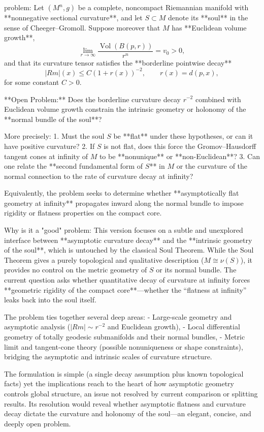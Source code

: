 problem:  
Let \((M^n, g)\) be a complete, noncompact Riemannian manifold with **nonnegative sectional curvature**, and let \(S\subset M\) denote its **soul** in the sense of Cheeger–Gromoll.  
Suppose moreover that \(M\) has **Euclidean volume growth**,  
\[
\lim_{r\to\infty}\frac{\operatorname{Vol}(B(p,r))}{r^n}=v_0>0,
\]
and that its curvature tensor satisfies the **borderline pointwise decay**
\[
|Rm|(x)\le C(1+r(x))^{-2},\qquad r(x)=d(p,x),
\]
for some constant \(C>0\).

**Open Problem:**  
Does the borderline curvature decay \(r^{-2}\) combined with Euclidean volume growth constrain the intrinsic geometry or holonomy of the **normal bundle of the soul**?  

More precisely:
1. Must the soul \(S\) be **flat** under these hypotheses, or can it have positive curvature?  
2. If \(S\) is not flat, does this force the Gromov–Hausdorff tangent cones at infinity of \(M\) to be **nonunique** or **non-Euclidean**?  
3. Can one relate the **second fundamental form of \(S\)** in \(M\) or the curvature of the normal connection to the rate of curvature decay at infinity?

Equivalently, the problem seeks to determine whether **asymptotically flat geometry at infinity** propagates inward along the normal bundle to impose rigidity or flatness properties on the compact core.

Why is it a "good" problem:  
This version focuses on a subtle and unexplored interface between **asymptotic curvature decay** and the **intrinsic geometry of the soul**, which is untouched by the classical Soul Theorem.  
While the Soul Theorem gives a purely topological and qualitative description (\(M\cong\nu(S)\)), it provides no control on the metric geometry of \(S\) or its normal bundle. The current question asks whether quantitative decay of curvature at infinity forces **geometric rigidity of the compact core**—whether the “flatness at infinity” leaks back into the soul itself.

The problem ties together several deep areas:
- Large-scale geometry and asymptotic analysis (\(|Rm|\sim r^{-2}\) and Euclidean growth),
- Local differential geometry of totally geodesic submanifolds and their normal bundles,
- Metric limit and tangent-cone theory (possible nonuniqueness or shape constraints),
bridging the asymptotic and intrinsic scales of curvature structure.

The formulation is simple (a single decay assumption plus known topological facts) yet the implications reach to the heart of how asymptotic geometry controls global structure, an issue not resolved by current comparison or splitting results. Its resolution would reveal whether asymptotic flatness and curvature decay dictate the curvature and holonomy of the soul—an elegant, concise, and deeply open problem.